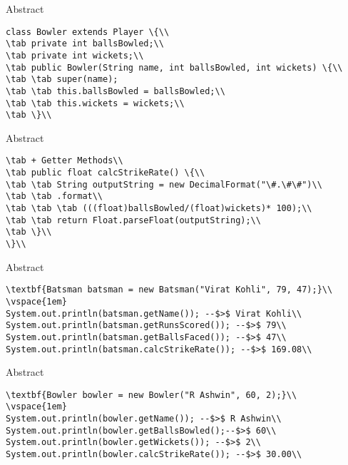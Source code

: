 \documentclass[aspectratio=169,14pt,usenames,dvipsnames]{beamer}
\newcommand\tab[1][1cm]{\hspace*{#1}}
\begin{document}
\begin{frame}{Abstract}
\begin{lstlisting}
class Bowler extends Player \{\\
\tab private int ballsBowled;\\
\tab private int wickets;\\
\tab public Bowler(String name, int ballsBowled, int wickets) \{\\
\tab \tab super(name);
\tab \tab this.ballsBowled = ballsBowled;\\
\tab \tab this.wickets = wickets;\\
\tab \}\\
\end{lstlisting}
\end{frame}

\begin{frame}{Abstract}
\begin{lstlisting}
\tab + Getter Methods\\
\tab public float calcStrikeRate() \{\\
\tab \tab String outputString = new DecimalFormat("\#.\#\#")\\
\tab \tab .format\\
\tab \tab \tab (((float)ballsBowled/(float)wickets)* 100);\\
\tab \tab return Float.parseFloat(outputString);\\
\tab \}\\
\}\\
\end{lstlisting}
\end{frame}

\begin{frame}{Abstract}
\begin{lstlisting}
\textbf{Batsman batsman = new Batsman("Virat Kohli", 79, 47);}\\
\vspace{1em}
System.out.println(batsman.getName()); --$>$ Virat Kohli\\
System.out.println(batsman.getRunsScored()); --$>$ 79\\
System.out.println(batsman.getBallsFaced()); --$>$ 47\\
System.out.println(batsman.calcStrikeRate()); --$>$ 169.08\\
\end{lstlisting}
\end{frame}

\begin{frame}{Abstract}
\begin{lstlisting}
\textbf{Bowler bowler = new Bowler("R Ashwin", 60, 2);}\\
\vspace{1em}
System.out.println(bowler.getName()); --$>$ R Ashwin\\
System.out.println(bowler.getBallsBowled();--$>$ 60\\
System.out.println(bowler.getWickets()); --$>$ 2\\
System.out.println(bowler.calcStrikeRate()); --$>$ 30.00\\
\end{lstlisting}
\end{frame}
\end{document}
